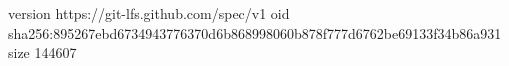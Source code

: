 version https://git-lfs.github.com/spec/v1
oid sha256:895267ebd6734943776370d6b868998060b878f777d6762be69133f34b86a931
size 144607
